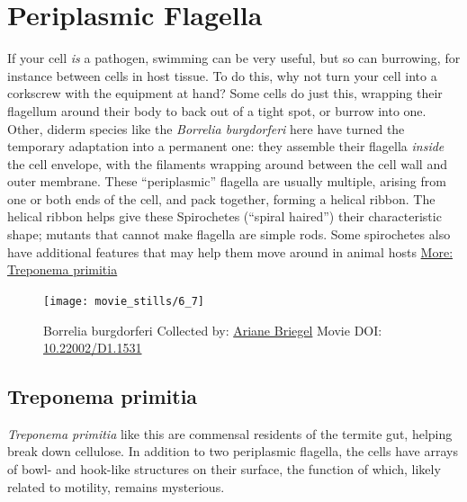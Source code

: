 \documentclass[]{tufte-book}
\begin{document}
\section{Periplasmic Flagella}\label{periplasmic-flagella}

If your cell \emph{is} a pathogen, swimming can be very useful, but so
can burrowing, for instance between cells in host tissue. To do this,
why not turn your cell into a corkscrew with the equipment at hand? Some
cells do just this, wrapping their flagellum around their body to back
out of a tight spot, or burrow into one. Other, diderm species like the
\emph{Borrelia burgdorferi} here have turned the temporary adaptation
into a permanent one: they assemble their flagella \emph{inside} the
cell envelope, with the filaments wrapping around between the cell wall
and outer membrane. These ``periplasmic'' flagella are usually multiple,
arising from one or both ends of the cell, and pack together, forming a
helical ribbon. The helical ribbon helps give these Spirochetes
(``spiral haired'') their characteristic shape; mutants that cannot make
flagella are simple rods. Some spirochetes also have additional features
that may help them move around in animal hosts
\protect\hyperlink{Treponema_primitia}{More: Treponema primitia}





\begin{figure}
\texttt{[image: movie\_stills/6\_7]} \caption[Borrelia burgdorferi Collected by:
\protect\hyperlink{ariane_briegel}{Ariane Briegel} Movie DOI:
\href{https://doi.org/10.22002/D1.1531}{10.22002/D1.1531}]{Borrelia burgdorferi Collected by:
\protect\hyperlink{ariane_briegel}{Ariane Briegel} Movie DOI:
\href{https://doi.org/10.22002/D1.1531}{10.22002/D1.1531}}\label{fig:6-7}
\end{figure}

\hypertarget{Treponema_primitia}{\subsection{Treponema
primitia}\label{Treponema_primitia}}

\emph{Treponema primitia} like this are commensal residents of the
termite gut, helping break down cellulose. In addition to two
periplasmic flagella, the cells have arrays of bowl- and hook-like
structures on their surface, the function of which, likely related to
motility, remains mysterious.
\end{document}
